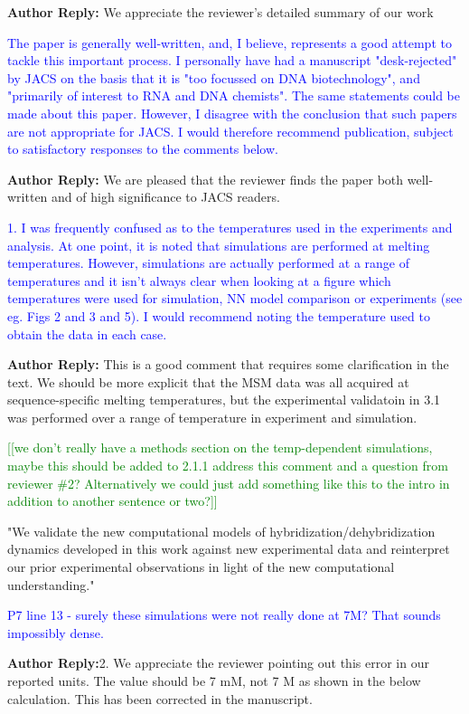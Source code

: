\documentclass[11pt,a4paper]{letter} %
\newcommand*{\rood}[1]{{\color{red}{#1}}}
\newcommand*{\noteg}[1]{\textcolor{green}{[[#1]]}}		%
\begin{document}
\textbf{Author Reply:}   We appreciate the reviewer's detailed summary of our work

\textcolor{blue}{The paper is generally well-written, and, I believe, represents a good attempt to tackle this important process. I personally have had a manuscript "desk-rejected" by JACS on the basis that it is "too focussed on DNA biotechnology", and "primarily of interest to RNA and DNA chemists". The same statements could be made about this paper. However, I disagree with the conclusion that such papers are not appropriate for JACS. I would therefore recommend publication, subject to satisfactory responses to the comments below.  }

\textbf{Author Reply:}   We are pleased that the reviewer finds the paper both well-written and of high significance to JACS readers.

\textcolor{blue}{1.   I was frequently confused as to the temperatures used in the experiments and analysis. At one point, it is noted that simulations are performed at melting temperatures. However, simulations are actually performed at a range of temperatures and it isn't always clear when looking at a figure which temperatures were used for simulation, NN model comparison or experiments (see eg. Figs 2 and 3 and 5). I would recommend noting the temperature used to obtain the data in each case.}

\textbf{Author Reply:}   This is a good comment that requires some clarification in the text. We should be more explicit that the MSM data was all acquired at sequence-specific melting temperatures, but the experimental validatoin in 3.1 was performed over a range of temperature in experiment and simulation. 

\noteg{we don't really have a methods section on the temp-dependent simulations, maybe this should be added to 2.1.1 address this comment and a question from reviewer \#2? Alternatively we could just add something like this to the intro in addition to another sentence or two?}

"We validate the new computational models of hybridization/dehybridization dynamics developed in this work against new experimental data \rood{over a range of temperatures} and reinterpret our prior experimental observations in light of the new computational understanding."

\textcolor{blue}{P7 line 13 - surely these simulations were not really done at 7M? That sounds impossibly dense.}

\textbf{Author Reply:}2.    We appreciate the reviewer pointing out this error in our reported units. The value should be 7 mM, not 7 M as shown in the below calculation. This has been corrected in the manuscript. 
\end{document}
